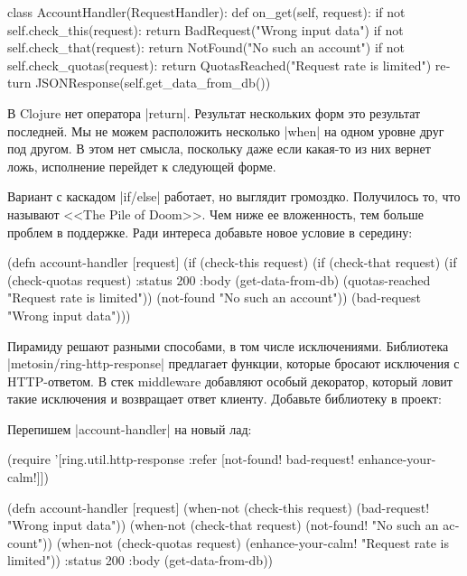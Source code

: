 \begin{english}
  \begin{python}
class AccountHandler(RequestHandler):
  def on_get(self, request):
    if not self.check_this(request):
      return BadRequest("Wrong input data")
    if not self.check_that(request):
      return NotFound("No such an account")
    if not self.check_quotas(request):
      return QuotasReached("Request rate is limited")
    return JSONResponse(self.get_data_from_db())
  \end{python}
\end{english}

В Clojure нет оператора \spverb|return|. Результат нескольких форм это результат
последней. Мы не можем расположить несколько \spverb|when| на одном уровне друг
под другом. В этом нет смысла, поскольку даже если какая-то из них вернет ложь,
исполнение перейдет к следующей форме.

Вариант с каскадом \spverb|if/else| работает, но выглядит громоздко. Получилось
то, что называют <<The Pile of Doom>>. Чем ниже ее вложенность, тем больше
проблем в поддержке. Ради интереса добавьте новое условие в середину:

\begin{english}
  \begin{clojure}
(defn account-handler [request]
  (if (check-this request)
    (if (check-that request)
      (if (check-quotas request)
        {:status 200
         :body (get-data-from-db)}
        (quotas-reached "Request rate is limited"))
      (not-found "No such an account"))
    (bad-request "Wrong input data")))
  \end{clojure}
\end{english}

Пирамиду решают разными способами, в том числе исключениями. Библиотека
\spverb|metosin/ring-http-response| предлагает функции, которые бросают
исключения с HTTP-ответом. В стек middleware добавляют особый декоратор, который
ловит такие исключения и возвращает ответ клиенту. Добавьте библиотеку в проект:

\begin{english}
  \begin{clojure}
  \end{clojure}
\end{english}

Перепишем \spverb|account-handler| на новый лад:

\begin{english}
  \begin{clojure}
(require '[ring.util.http-response
           :refer [not-found!
                   bad-request!
                   enhance-your-calm!]])

(defn account-handler [request]
  (when-not (check-this request)
    (bad-request! "Wrong input data"))
  (when-not (check-that request)
    (not-found! "No such an account"))
  (when-not (check-quotas request)
    (enhance-your-calm! "Request rate is limited"))
  {:status 200
   :body (get-data-from-db)})
  \end{clojure}
\end{english}

